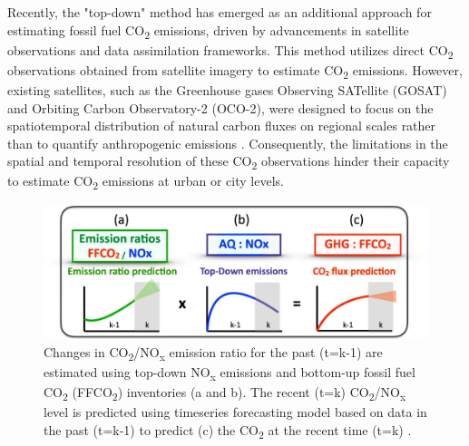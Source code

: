 Recently, the "top-down" method has emerged as an additional approach for estimating fossil fuel CO\textsubscript{2} emissions, driven by advancements in satellite observations and data assimilation frameworks. This method utilizes direct CO\textsubscript{2} observations obtained from satellite imagery to estimate CO\textsubscript{2} emissions. However, existing satellites, such as the Greenhouse gases Observing SATellite (GOSAT) and Orbiting Carbon Observatory-2 (OCO-2), were designed to focus on the spatiotemporal distribution of natural carbon fluxes on regional scales rather than to quantify anthropogenic emissions \citep{nassar2017quantifying, yang2023using}. Consequently, the limitations in the spatial and temporal resolution of these CO\textsubscript{2} observations hinder their capacity to estimate CO\textsubscript{2} emissions at urban or city levels. \par

\begin{figure}[tbh!]
    \centering
    \includegraphics[width=\textwidth]{figs/chap2/aq_nox_ratio.png}
    \caption[Fossil fuel CO\textsubscript{2} prediction from top-down NO\textsubscript{x}]{Changes in CO\textsubscript{2}/NO\textsubscript{x} emission ratio for the past (t=k-1) are estimated using top-down NO\textsubscript{x} emissions and bottom-up fossil fuel CO\textsubscript{2} (FFCO\textsubscript{2}) inventories (a and b). The recent (t=k) CO\textsubscript{2}/NO\textsubscript{x} level is predicted using timeseries forecasting model based on data in the past (t=k-1) to predict (c) the CO\textsubscript{2} at the recent time (t=k) \citep{miyazaki2023predictability}.}
    \label{fig:chap2_fig2}
\end{figure}

